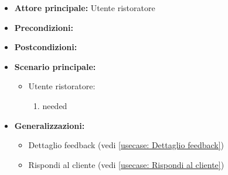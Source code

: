 \label{usecase:Lista dei feedback}
\begin{itemize}
\item \textbf{Attore principale:}  Utente ristoratore
\item \textbf{Precondizioni:}
\item \textbf{Postcondizioni:}
\item \textbf{Scenario principale:}
\begin{itemize}
\item  Utente ristoratore:
\begin{enumerate}
\item needed
\end{enumerate}
\end{itemize}
\item \textbf{Generalizzazioni:}
\begin{itemize}
\item  Dettaglio feedback (vedi \autoref{usecase: Dettaglio feedback})
\item  Rispondi al cliente (vedi \autoref{usecase: Rispondi al cliente})
\end{itemize}
\end{itemize}